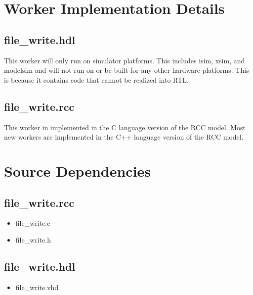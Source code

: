 \documentclass{article}
\def\comp{file\_write}
\begin{document}
\section*{Worker Implementation Details}
\subsection*{\comp.hdl}
\begin{flushleft}
This worker will only run on simulator platforms.  This includes isim, xsim, and modelsim and will not run on or be built for any other hardware platforms.  This is because it contains code that cannot be realized into RTL.
\end{flushleft}
\subsection*{\comp.rcc}
\begin{flushleft}
This worker in implemented in the C language version of the RCC model.  Most new workers are implemented in the C++ language version of the RCC model.
\end{flushleft}

\section*{Source Dependencies}
\subsection*{\comp.rcc}
\begin{itemize}
\item file\_write.c
\item file\_write.h
\end{itemize}
\subsection*{\comp.hdl}
\begin{itemize}
\item file\_write.vhd
\end{itemize}
\end{document}

